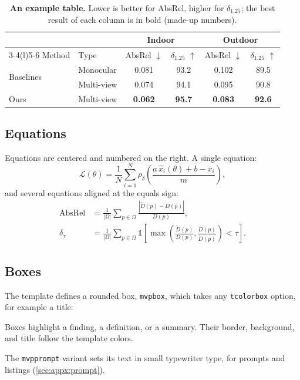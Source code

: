 \documentclass[10pt,letterpaper]{article}
\begin{document}
\begin{table}[t]
\centering
\caption{\textbf{An example table.} Lower is better for AbsRel, higher for $\delta_{1.25}$; the best result of each
column is in bold (made-up numbers).}
\label{tab:example}
\small
\begin{tabular}{@{}llcccc@{}}
\toprule
& & \multicolumn{2}{c}{Indoor} & \multicolumn{2}{c}{Outdoor} \\
\cmidrule(lr){3-4}\cmidrule(l){5-6}
Method & Type & AbsRel $\downarrow$ & $\delta_{1.25}$ $\uparrow$ & AbsRel $\downarrow$ & $\delta_{1.25}$ $\uparrow$ \\
\midrule
\multirow{2}{*}{Baselines} & Monocular & 0.081 & 93.2 & 0.102 & 89.5 \\
 & Multi-view & 0.074 & 94.1 & 0.095 & 90.8 \\
\midrule
Ours & Multi-view & \textbf{0.062} & \textbf{95.7} & \textbf{0.083} & \textbf{92.6} \\
\bottomrule
\end{tabular}
\end{table}

\subsection{Equations}
\label{sec:usage:eq}
Equations are centered and numbered on the right. A single equation:
\begin{equation}
  \mathcal{L}(\theta) = \frac{1}{N}\sum_{i=1}^{N} \rho_\delta\!\left(\frac{a\,\hat{x}_i(\theta)+b-x_i}{m}\right),
  \label{eq:loss}
\end{equation}
and several equations aligned at the equals sign:
\begin{align}
  \mathrm{AbsRel} &= \frac{1}{|\Omega|}\sum_{p\in\Omega}\frac{|\tilde{D}(p)-D(p)|}{D(p)}, \label{eq:absrel}\\
  \delta_{\tau} &= \frac{1}{|\Omega|}\sum_{p\in\Omega}\mathbb{1}\!\left[\max\!\left(\frac{\tilde{D}(p)}{D(p)},
    \frac{D(p)}{\tilde{D}(p)}\right)<\tau\right]. \label{eq:delta}
\end{align}

\subsection{Boxes}
\label{sec:usage:boxes}
The template defines a rounded box, \verb|mvpbox|, which takes any \texttt{tcolorbox} option, for example a title:
\begin{mvpbox}[title=Key finding]
Boxes highlight a finding, a definition, or a summary. Their border, background, and title follow the template
colors.
\end{mvpbox}
The \verb|mvpprompt| variant sets its text in small typewriter type, for prompts and listings (\cref{sec:appx:prompt}).
\end{document}
